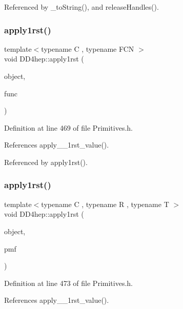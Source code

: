 Referenced by \+\_\+to\+String(), and release\+Handles().

\hypertarget{namespace_d_d4hep_aab8df72602001832a3e4105705b0eb66}{}\label{namespace_d_d4hep_aab8df72602001832a3e4105705b0eb66} 
\subsubsection{\texorpdfstring{apply1rst()}{apply1rst()}\hspace{0.1cm}{\footnotesize\ttfamily [1/3]}}
{\footnotesize\ttfamily template$<$typename C , typename F\+CN $>$ \\
void D\+D4hep\+::apply1rst (\begin{DoxyParamCaption}\item[{C \&}]{object,  }\item[{const F\+CN \&}]{func }\end{DoxyParamCaption})}



Definition at line 469 of file Primitives.\+h.



References apply\+\_\+\+\_\+1rst\+\_\+value().



Referenced by apply1rst().

\hypertarget{namespace_d_d4hep_a75d29652b2ebf470d395c581d50ed63c}{}\label{namespace_d_d4hep_a75d29652b2ebf470d395c581d50ed63c} 
\subsubsection{\texorpdfstring{apply1rst()}{apply1rst()}\hspace{0.1cm}{\footnotesize\ttfamily [2/3]}}
{\footnotesize\ttfamily template$<$typename C , typename R , typename T $>$ \\
void D\+D4hep\+::apply1rst (\begin{DoxyParamCaption}\item[{C \&}]{object,  }\item[{R(T\+::$\ast$)()}]{pmf }\end{DoxyParamCaption})}



Definition at line 473 of file Primitives.\+h.



References apply\+\_\+\+\_\+1rst\+\_\+value().

